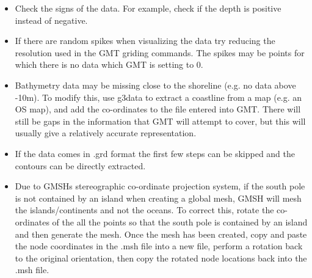 \begin{itemize}

\item Check the signs of the data. For example, check if the depth is positive instead of negative.

\item If there are random spikes when visualizing the data try reducing the resolution used in the GMT griding commands. The spikes
may be points for which there is no data which GMT is setting to 0.

\item Bathymetry data may be missing close to the shoreline (e.g. no data above -10m). To modify this, use g3data to extract a 
coastline from a map (e.g. an OS map), and add the co-ordinates to the file entered into GMT. There will still be gaps in the 
information that GMT will attempt to cover, but  this will usually give a relatively accurate representation.

\item If the data comes in .grd format the first few steps can be skipped and the contours can be directly extracted.

\item Due to GMSHs stereographic co-ordinate projection system, if the south pole is not contained by an island when creating a global 
mesh, GMSH will mesh the islands/continents and not the oceans. To correct this, rotate the co-ordinates of the all the 
points so that the south pole is contained by an island and then generate the mesh. Once the mesh has been created, copy and paste the node 
coordinates in the .msh file into a new file, perform a rotation back to the original orientation, then copy the rotated node locations back into the .msh file.

\end{itemize}


